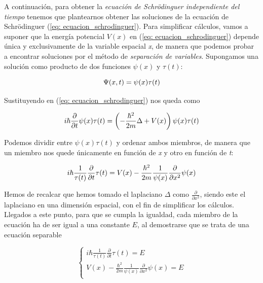 \documentclass{article}
\numberwithin{equation}{section} %
\begin{document}
    \vspace{5mm}

    A continuación, para obtener la \textit{ecuación de Schrödinguer independiente del tiempo} tenemos que plantearnos obtener las soluciones de la ecuación de Schrödinguer (\ref{eq: ecuacion_schrodinguer}). Para simplificar cálculos, vamos a suponer que la energía potencial \( V(x) \) en (\ref{eq: ecuacion_schrodinguer}) depende única y exclusivamente de la variable espacial \textit{x}, de manera que podemos probar a encontrar soluciones por el método de \textit{separación de variables}. Supongamos una solución como producto de dos funciones \( \psi(x) \) y \( \tau(t) \):

    \begin{equation*}
        \Psi(x, t) = \psi(x) \tau(t) \\[5pt]
    \end{equation*}

    Sustituyendo en (\ref{eq: ecuacion_schrodinguer}) nos queda como

    \begin{equation*}
        i \hbar \frac{\partial}{\partial t} \psi(x) \tau(t) = \left( - \frac{\hbar^{2}}{2m} \Delta + V(x) \right) \psi(x) \tau(t) \\[5pt]
    \end{equation*}

    Podemos dividir entre \( \psi(x) \tau(t) \) y ordenar ambos miembros, de manera que un miembro nos quede únicamente en función de \textit{x} y otro en función de \textit{t}:

    \begin{equation*}
        i \hbar \frac{1}{\tau(t)} \frac{\partial}{\partial t} \tau(t) = V(x) - \frac{\hbar^{2}}{2m} \frac{1}{\psi(x)} \frac{\partial}{\partial x^{2}} \psi(x) \\[5pt]
    \end{equation*}

    Hemos de recalcar que hemos tomado el laplaciano \( \Delta \) como \( \frac{\partial}{\partial x^{2}} \), siendo este el laplaciano en una dimensión espacial, con el fin de simplificar los cálculos. Llegados a este punto, para que se cumpla la igualdad, cada miembro de la ecuación ha de ser igual a una constante \( E \), al demostrarse que se trata de una ecuación separable
    
    \begin{equation}
        \begin{cases}
            \displaystyle i \hbar \frac{1}{\tau(t)} \frac{\partial}{\partial t} \tau(t) = E \\[10pt]
            \displaystyle V(x) - \frac{\hbar^{2}}{2m} \frac{1}{\psi(x)} \frac{\partial}{\partial x^{2}} \psi(x) = E \\[10pt]
        \end{cases}
        \label{eq: separacion_variables}
    \end{equation}
\end{document}
